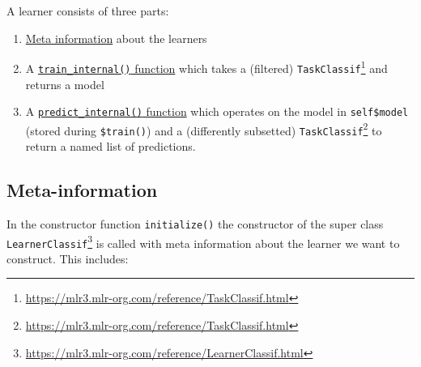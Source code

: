 \documentclass[12pt,]{scrbook}
\providecommand{\tightlist}{%
  \setlength{\itemsep}{0pt}\setlength{\parskip}{0pt}}
\renewcommand{\href}[2]{#2\footnote{\url{#1}}}
\begin{document}
A learner consists of three parts:

\begin{enumerate}
\def\labelenumi{\arabic{enumi}.}
\tightlist
\item
  \protect\hyperlink{learner-meta-information}{Meta information} about the learners
\item
  A \protect\hyperlink{learner-train}{\texttt{train\_internal()} function} which takes a (filtered) \href{https://mlr3.mlr-org.com/reference/TaskClassif.html}{\texttt{TaskClassif}} and returns a model
\item
  A \protect\hyperlink{learner-predict}{\texttt{predict\_internal()} function} which operates on the model in \texttt{self\$model} (stored during \texttt{\$train()}) and a (differently subsetted) \href{https://mlr3.mlr-org.com/reference/TaskClassif.html}{\texttt{TaskClassif}} to return a named list of predictions.
\end{enumerate}

\hypertarget{learner-meta-information}{%
\subsection{Meta-information}\label{learner-meta-information}}

In the constructor function \texttt{initialize()} the constructor of the super class \href{https://mlr3.mlr-org.com/reference/LearnerClassif.html}{\texttt{LearnerClassif}} is called with meta information about the learner we want to construct.
This includes:
\end{document}
